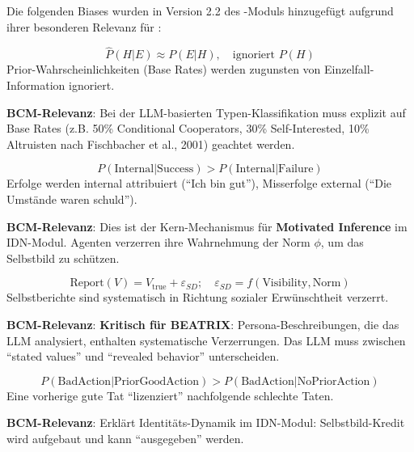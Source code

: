 Die folgenden Biases wurden in Version 2.2 des \META-Moduls hinzugefügt aufgrund ihrer besonderen Relevanz für \BEATRIX:

\begin{axiom}
\begin{equation}
\hat{P}(H|E) \approx P(E|H), \quad \text{ignoriert } P(H)
\end{equation}
Prior-Wahrscheinlichkeiten (Base Rates) werden zugunsten von Einzelfall-Information ignoriert.

\textbf{BCM-Relevanz}: Bei der LLM-basierten Typen-Klassifikation muss explizit auf Base Rates (z.B. 50\% Conditional Cooperators, 30\% Self-Interested, 10\% Altruisten nach Fischbacher et al., 2001) geachtet werden.
\end{axiom}

\begin{axiom}
\begin{equation}
P(\text{Internal}|\text{Success}) > P(\text{Internal}|\text{Failure})
\end{equation}
Erfolge werden internal attribuiert (``Ich bin gut''), Misserfolge external (``Die Umstände waren schuld'').

\textbf{BCM-Relevanz}: Dies ist der Kern-Mechanismus für \textbf{Motivated Inference} im IDN-Modul. Agenten verzerren ihre Wahrnehmung der Norm $\phi$, um das Selbstbild zu schützen.
\end{axiom}

\begin{axiom}
\begin{equation}
\text{Report}(V) = V_{\text{true}} + \varepsilon_{SD}; \quad \varepsilon_{SD} = f(\text{Visibility}, \text{Norm})
\end{equation}
Selbstberichte sind systematisch in Richtung sozialer Erwünschtheit verzerrt.

\textbf{BCM-Relevanz}: \textbf{Kritisch für BEATRIX}: Persona-Beschreibungen, die das LLM analysiert, enthalten systematische Verzerrungen. Das LLM muss zwischen ``stated values'' und ``revealed behavior'' unterscheiden.
\end{axiom}

\begin{axiom}
\begin{equation}
P(\text{BadAction}|\text{PriorGoodAction}) > P(\text{BadAction}|\text{NoPriorAction})
\end{equation}
Eine vorherige gute Tat ``lizenziert'' nachfolgende schlechte Taten.

\textbf{BCM-Relevanz}: Erklärt Identitäts-Dynamik im IDN-Modul: Selbstbild-Kredit wird aufgebaut und kann ``ausgegeben'' werden.
\end{axiom}

